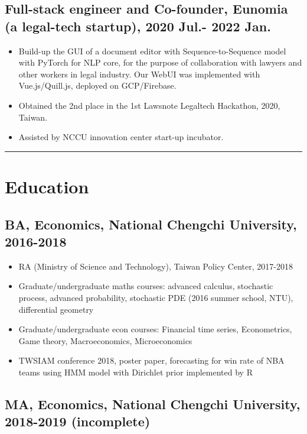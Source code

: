 \documentclass[11pt]{article}
\begin{document}
\begin{multicols*}{2}
\subsection*{Full-stack engineer and Co-founder, Eunomia (a legal-tech startup), 2020 Jul.- 2022 Jan.}
\begin{itemize}[noitemsep]
    \item Build-up the GUI of a document editor with Sequence-to-Sequence model with PyTorch for NLP core, for the purpose of collaboration with lawyers and other workers in legal industry. Our WebUI was implemented with Vue.js/Quill.js, deployed on GCP/Firebase.
    \item Obtained the 2nd place in the 1st Lawsnote Legaltech Hackathon, 2020, Taiwan.
    \item Assisted by NCCU innovation center start-up incubator.
\end{itemize}

\hrule

\section*{Education}

\subsection*{BA, Economics, National Chengchi University, 2016-2018}

    \begin{itemize}[noitemsep]
        \item RA (Ministry of Science and Technology), Taiwan Policy Center, 2017-2018
        \item Graduate/undergraduate maths courses: advanced calculus, stochastic process, advanced probability, stochastic PDE (2016 summer school, NTU), differential geometry
        \item Graduate/undergraduate econ courses: Financial time series, Econometrics, Game theory, Macroeconomics, Microeconomics
        \item TWSIAM conference 2018, poster paper, forecasting for win rate of NBA teams using HMM model with Dirichlet prior implemented by R
    \end{itemize}


\subsection*{MA, Economics, National Chengchi University, 2018-2019 (incomplete)}


\end{multicols*}
\end{document}
